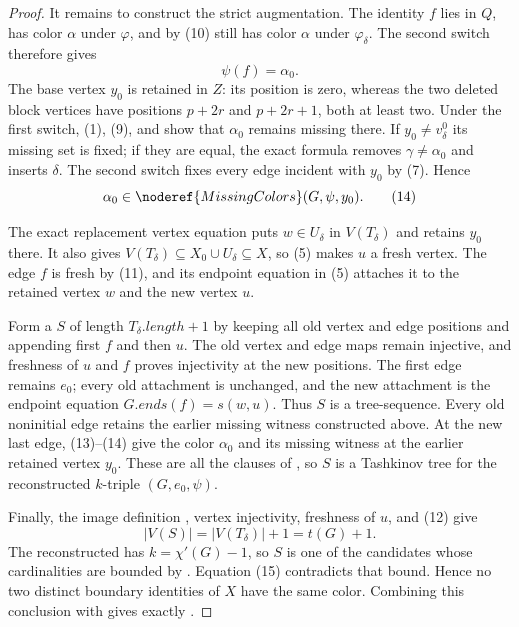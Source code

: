 \begin{proof}
It remains to construct the strict augmentation.  The identity $f$ lies in
$Q$, has color $\alpha$ under $\varphi$, and by (10) still has color
$\alpha$ under $\varphi_\delta$.  The second switch therefore gives
\[
 \psi(f)=\alpha_0.                                         \tag{13}
\]
The base vertex $y_0$ is retained in $Z$: its position is zero, whereas
the two deleted block vertices have positions $p+2r$ and $p+2r+1$, both
at least two.  Under the first switch, (1), (9), and
 show that $\alpha_0$ remains
missing there.  If $y_0\ne v^0_\delta$ its missing set is fixed; if they
are equal, the exact formula removes $\gamma\ne\alpha_0$ and inserts
$\delta$.  The second switch fixes every edge incident with $y_0$ by (7).
Hence
\[
 \alpha_0\in\noderef{MissingColors}(G,\psi,y_0).            \tag{14}
\]

The exact replacement vertex equation puts $w\in U_\delta$ in
$V(T_\delta)$ and retains $y_0$ there.  It also gives
$V(T_\delta)\subseteq X_0\cup U_\delta\subseteq X$, so (5) makes $u$ a
fresh vertex.  The edge $f$ is fresh by (11), and its endpoint equation in
(5) attaches it to the retained vertex $w$ and the new vertex $u$.

Form a  $S$ of length
$T_\delta.length+1$ by keeping all old vertex and edge positions and
appending first $f$ and then $u$.  The old vertex and edge maps remain
injective, and freshness of $u$ and $f$ proves injectivity at the new
positions.  The first edge remains $e_0$; every old attachment is
unchanged, and the new attachment is the endpoint equation $G.ends(f)=s(w,u)$.
Thus $S$ is a tree-sequence.  Every old noninitial edge retains the earlier
missing witness constructed above.  At the new last edge, (13)--(14) give
the color $\alpha_0$ and its missing witness at the earlier retained vertex
$y_0$.  These are all the clauses of , so $S$ is a
Tashkinov tree for the reconstructed $k$-triple $(G,e_0,\psi)$.

Finally, the image definition , vertex
injectivity, freshness of $u$, and (12) give
\[
 |V(S)|=|V(T_\delta)|+1=t(G)+1.                             \tag{15}
\]
The reconstructed  has $k=\chi'(G)-1$, so $S$ is one of
the candidates whose cardinalities are bounded by
.  Equation (15) contradicts that bound.  Hence no
two distinct boundary identities of $X$ have the same color.  Combining
this conclusion with  gives exactly
.
\end{proof}
